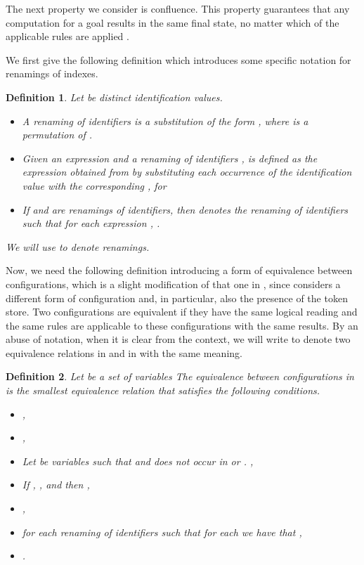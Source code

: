 \documentclass{tlp}
\newtheorem{definition}{Definition} \newtheorem{proposition}{Proposition} \newtheorem{example}{Example} \newtheorem{corollary}{Corollary} \newtheorem{theorem}{Theorem} \newtheorem{lemma}{Lemma}
\begin{document}
The  next property we consider is confluence. This property guarantees that any computation for a goal
results in the same final state, no matter which of the applicable
rules are applied \cite{AF04,Fru04}.



We first give the following definition which introduces some specific notation for renamings of indexes.


\begin{definition}\label{def:renaming}
Let  be distinct identification values.
\begin{itemize}
  \item A renaming of identifiers is a
substitution of the form , where   is a permutation of .
  \item Given an expression  and a renaming of identifiers , 
  is defined as the expression obtained from  by
substituting each occurrence of the identification value 
with the corresponding , for 
  \item If  and  are renamings of identifiers, then  denotes the renaming of identifiers such that for each expression , .
\end{itemize}
 We will use  to denote renamings.
\end{definition}

Now, we need the
following definition introducing a form of equivalence between configurations, which is a slight modification of that one in \cite{RBF09},
since considers a different form of configuration  and, in particular, also the presence of the token store.
Two configurations are equivalent if they have the same logical reading and the same rules are applicable to these configurations with the same results. By an abuse of notation, when it is clear from the context, we will write  to denote two equivalence relations in
 and in  with the same meaning.


\begin{definition}\label{def:naltraeq}
Let  be a set of variables
The equivalence  between configurations in   is the smallest equivalence relation  that satisfies the following conditions.

\begin{itemize}
\item ,

\item ,

\item Let  be variables such that  and  does not occur in  or .
,

\item If , , and
 then
,

\item ,

\item 
for each renaming of identifiers  such that for each  we have that ,


\item
.
 \end{itemize}

\end{definition}
\end{document}
